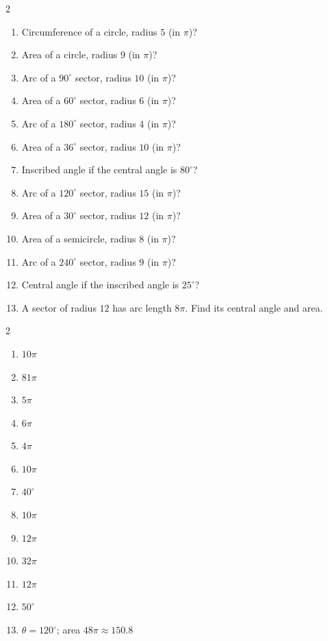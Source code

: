 \documentclass[11pt]{article}
\begin{document}
\begin{recapbox}
\begin{multicols}{2}
\small
\begin{enumerate}[leftmargin=*,itemsep=3pt]
  \item Circumference of a circle, radius $5$ (in $\pi$)?
  \item Area of a circle, radius $9$ (in $\pi$)?
  \item Arc of a $90^\circ$ sector, radius $10$ (in $\pi$)?
  \item Area of a $60^\circ$ sector, radius $6$ (in $\pi$)?
  \item Arc of a $180^\circ$ sector, radius $4$ (in $\pi$)?
  \item Area of a $36^\circ$ sector, radius $10$ (in $\pi$)?
  \item Inscribed angle if the central angle is $80^\circ$?
  \item Arc of a $120^\circ$ sector, radius $15$ (in $\pi$)?
  \item Area of a $30^\circ$ sector, radius $12$ (in $\pi$)?
  \item Area of a semicircle, radius $8$ (in $\pi$)?
  \item Arc of a $240^\circ$ sector, radius $9$ (in $\pi$)?
  \item Central angle if the inscribed angle is $25^\circ$?
  \item A sector of radius $12$ has arc length $8\pi$. Find its central angle and area.
\end{enumerate}
\end{multicols}
\end{recapbox}

\begin{keybox}
\begin{multicols}{2}
\small
\begin{enumerate}[leftmargin=*,itemsep=3pt]
  \item $10\pi$
  \item $81\pi$
  \item $5\pi$
  \item $6\pi$
  \item $4\pi$
  \item $10\pi$
  \item $40^\circ$
  \item $10\pi$
  \item $12\pi$
  \item $32\pi$
  \item $12\pi$
  \item $50^\circ$
  \item $\theta=120^\circ$; area $48\pi\approx150.8$
\end{enumerate}
\end{multicols}
\end{keybox}
\end{document}
